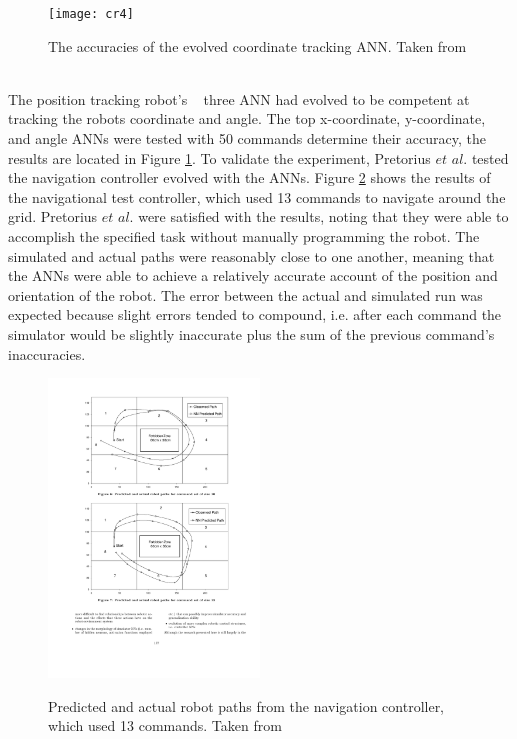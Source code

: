 \documentclass{sig-alternate}
\begin{document}
\begin{figure}%
\center
\caption{The accuracies of the evolved coordinate tracking ANN. Taken from ~\cite{Pretorius:2009:TAN:1632149.1632171}}

  \texttt{[image: cr4]}
\label{fig:ANNtable}
\end{figure}
	The  position tracking robot's ~\cite{Pretorius:2009:TAN:1632149.1632171} three ANN had evolved to be competent at tracking the robots coordinate and angle. The top x-coordinate, y-coordinate, and angle ANNs were tested with 50 commands determine their accuracy, the results are located in Figure \ref{fig:ANNtable}. To validate the experiment, Pretorius $et$ $al.$ tested the navigation controller evolved with the ANNs. Figure \ref{fig:position tracking grid} shows the results of the navigational test controller, which used 13 commands to navigate around the grid. Pretorius $et$ $al.$ were satisfied with the results, noting that they were able to accomplish the specified task without  manually programming the robot. The simulated and actual paths were reasonably close to one another, meaning that the ANNs were able to achieve a relatively accurate account of the position and orientation of the robot. The error between the actual and simulated run was expected because slight errors tended to compound, i.e. after each command the simulator would be slightly inaccurate plus the sum of the previous command's inaccuracies. 
	
\begin{figure}%
\center
\caption{Predicted and actual robot paths from the navigation controller, which used 13 commands. Taken from ~\cite{Pretorius:2009:TAN:1632149.1632171}}

  \includegraphics[width=0.5\textwidth, scale=.7]{cr3}
\label{fig:position tracking grid}
\end{figure}
	  
\end{document}
